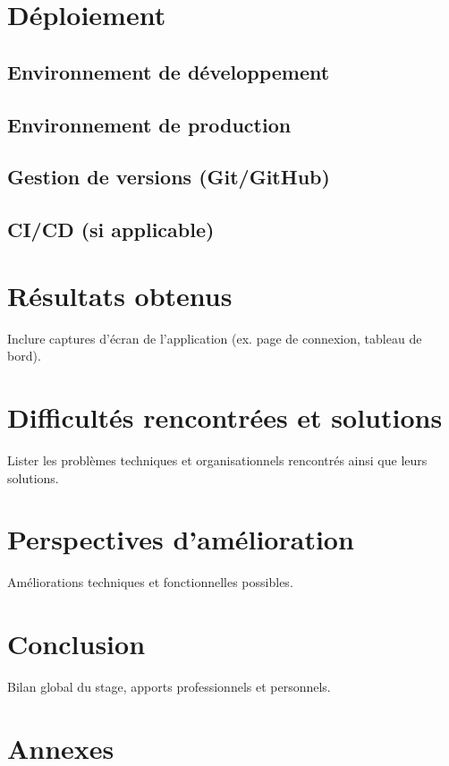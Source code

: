 \documentclass[12pt,a4paper]{report}
\begin{document}
\chapter{Déploiement}
\section{Environnement de développement}
\section{Environnement de production}
\section{Gestion de versions (Git/GitHub)}
\section{CI/CD (si applicable)}

\chapter{Résultats obtenus}
Inclure captures d’écran de l’application (ex. page de connexion, tableau de bord).  

\chapter{Difficultés rencontrées et solutions}
Lister les problèmes techniques et organisationnels rencontrés ainsi que leurs solutions.  

\chapter{Perspectives d’amélioration}
Améliorations techniques et fonctionnelles possibles.  

\chapter{Conclusion}
Bilan global du stage, apports professionnels et personnels.  

\appendix
\chapter{Annexes}
\end{document}
